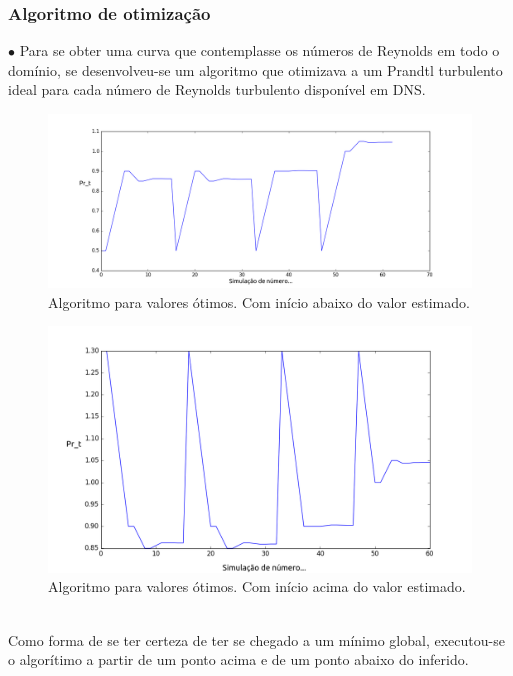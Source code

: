 \documentclass[xcolor=dvipsnames,10pt,aspectratio=169]{beamer}
\begin{document}
		\begin{frame}
		\frametitle{Algoritmo de otimização}
		$\bullet$ Para se obter uma curva que contemplasse os números de Reynolds em todo o domínio, se desenvolveu-se um algoritmo que otimizava a um Prandtl turbulento ideal para cada número de Reynolds turbulento disponível em DNS.\\
		\begin{minipage}[h!]{0.45\textwidth}
			\begin{figure}
				\centering
				\includegraphics[angle=0, scale=0.22]{convergnciacima}
				\caption{Algoritmo para valores ótimos. Com início abaixo do valor estimado.}
			\end{figure}
		\end{minipage}\hfill
		\begin{minipage}[h!]{0.45\textwidth}
			\begin{figure}
				\centering
				\includegraphics[angle=0, scale=0.22]{convergnciabaixo}
				\caption{Algoritmo para valores ótimos. Com início acima do valor estimado.}
			\end{figure}
		\end{minipage}\\
		Como forma de se ter certeza de ter se chegado a um mínimo global, executou-se o algorítimo a partir de um ponto acima e de um ponto abaixo do inferido. 		
		\end{frame}	
	
\end{document}
